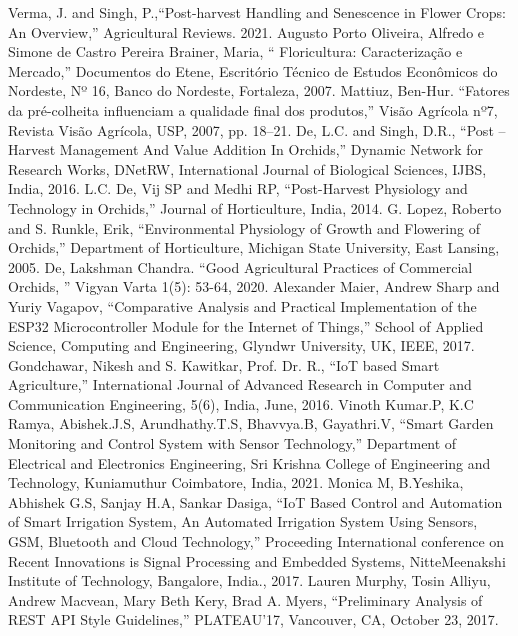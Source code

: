 \documentclass[conference]{IEEEtran}
\begin{document}
\begin{thebibliography}{00}
 Verma, J. and Singh, P.,``Post-harvest Handling and Senescence in Flower Crops: An Overview,'' Agricultural Reviews. 2021.
 Augusto Porto Oliveira, Alfredo e Simone de Castro Pereira Brainer, Maria, `` Floricultura: Caracterização e Mercado,'' Documentos do Etene, Escritório Técnico de Estudos Econômicos do Nordeste, Nº 16, Banco do Nordeste, Fortaleza, 2007.
 Mattiuz, Ben-Hur. ``Fatores da pré-colheita influenciam a qualidade final dos produtos,'' Visão Agrícola nº7, Revista Visão Agrícola, USP, 2007, pp. 18--21.
 De, L.C. and Singh, D.R., ``Post –Harvest Management And Value Addition In Orchids,'' Dynamic Network for Research Works, DNetRW, International Journal of Biological Sciences, IJBS, India, 2016.
 L.C. De, Vij SP and Medhi RP, ``Post-Harvest Physiology and Technology in Orchids,'' Journal of Horticulture, India, 2014.
 G. Lopez, Roberto and S. Runkle, Erik, ``Environmental Physiology of Growth and Flowering of Orchids,'' Department of Horticulture, Michigan State University, East Lansing, 2005.
 De, Lakshman Chandra. ``Good Agricultural Practices of Commercial Orchids, '' Vigyan Varta 1(5): 53-64, 2020.
 Alexander Maier, Andrew Sharp and Yuriy Vagapov, ``Comparative Analysis and Practical Implementation
of the ESP32 Microcontroller Module for the Internet of Things,'' School of Applied Science, Computing and Engineering, Glyndwr University, UK, IEEE, 2017.
 Gondchawar, Nikesh and S. Kawitkar, Prof. Dr. R., ``IoT based Smart Agriculture,'' International Journal of Advanced Research in Computer and Communication Engineering, 5(6), India, June, 2016.
 Vinoth Kumar.P, K.C Ramya, Abishek.J.S, Arundhathy.T.S, Bhavvya.B, Gayathri.V, ``Smart Garden Monitoring and Control System with Sensor Technology,''  Department of Electrical and Electronics Engineering, Sri Krishna College of Engineering and Technology, Kuniamuthur Coimbatore, India, 2021.
 Monica M, B.Yeshika, Abhishek G.S, Sanjay H.A, Sankar Dasiga, ``IoT Based Control and Automation of Smart
Irrigation System, An Automated Irrigation System Using Sensors, GSM, Bluetooth and Cloud Technology,'' Proceeding International conference on Recent Innovations is Signal Processing and Embedded Systems, NitteMeenakshi Institute of Technology, Bangalore, India., 2017.
 Lauren Murphy, Tosin Alliyu, Andrew Macvean, Mary Beth Kery, Brad A. Myers, ``Preliminary Analysis of REST API Style Guidelines,'' PLATEAU’17, Vancouver, CA, October 23, 2017.

\end{thebibliography}
\end{document}
